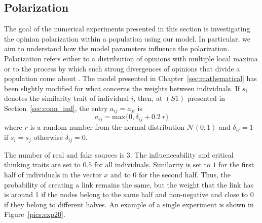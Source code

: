 \subsection{Polarization}
\label{sec:polarization}
The goal of the numerical experiments presented in this section is investigating the opinion polarization within a population using our model. In particular, we aim to understand how the model parameters influence the polarization. 
Polarization refers either to a distribution of opinions with multiple local maxima or to the process by which such strong divergences of opinions that divide a population come about \cite{Banisch2019}\cite{Bramsona2016}. The model presented in Chapter~\ref{sec:mathematical} has been slightly modified for what concerns the weights between individuals. If $s_i$ denotes the similarity trait of individual $i$, then, at $(S1)$ presented in Section~\ref{sec:conn_ind}, the entry $a_{ij} = a_{ji}$ is 
$$
a_{ij} = \text{max}\{0, \delta_{ij} + 0.2\ r\}
$$
where $r$ is a random number from the normal distribution $\mathcal{N}(0,1)$ and $\delta_{ij} = 1$ if $s_i = s_j$ otherwise $\delta_{ij} = 0$.

The number of real and fake sources is 3. The influenceability and critical thinking traits are set to $0.5$ for all individuals. Similarity is set to $1$ for the first half of individuals in the vector $x$ and to $0$ for the second half. Thus, the probability of creating a link remains the same, but the weight that the link has is around 1 if the nodes belong to the same half and non-negative and close to 0 if they belong to different halves. An example of a single experiment is shown in Figure~\ref{pics:exp20}.\\

